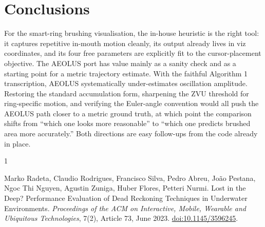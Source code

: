 \documentclass[a4paper,11pt]{article}
\begin{document}
\section{Conclusions}

For the smart-ring brushing visualisation, the in-house heuristic is the
right tool: it captures repetitive in-mouth motion cleanly, its output
already lives in viz coordinates, and its four free parameters are
explicitly fit to the cursor-placement objective. The AEOLUS port has value
mainly as a sanity check and as a starting point for a metric trajectory
estimate. With the faithful Algorithm 1 transcription, AEOLUS systematically
under-estimates oscillation amplitude. Restoring the standard accumulation
form, sharpening the ZVU threshold for ring-specific motion, and verifying
the Euler-angle convention would all push the AEOLUS path closer to a
metric ground truth, at which point the comparison shifts from ``which one
looks more reasonable'' to ``which one predicts brushed area more
accurately.'' Both directions are easy follow-ups from the code already in
place.

\begin{thebibliography}{1}

Marko Radeta, Claudio Rodrigues, Francisco Silva, Pedro Abreu, Jo\~ao Pestana,
Ngoc Thi Nguyen, Agustin Zuniga, Huber Flores, Petteri Nurmi.
\newblock Lost in the Deep? Performance Evaluation of Dead Reckoning Techniques
in Underwater Environments.
\newblock \emph{Proceedings of the ACM on Interactive, Mobile, Wearable and
Ubiquitous Technologies}, 7(2), Article 73, June 2023.
\newblock \href{https://doi.org/10.1145/3596245}{doi:10.1145/3596245}.

\end{thebibliography}
\end{document}
